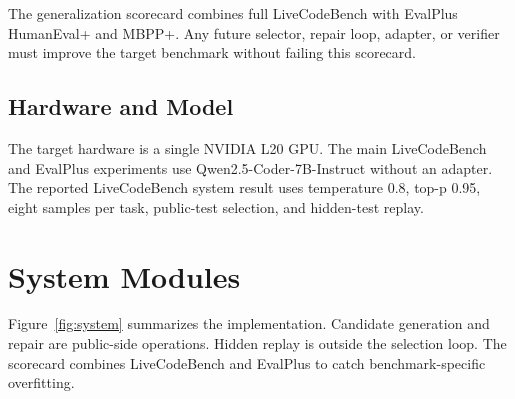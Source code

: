 \documentclass[11pt]{article}
\begin{document}
The generalization scorecard combines full LiveCodeBench with EvalPlus
HumanEval+ and MBPP+. Any future selector, repair loop, adapter, or verifier
must improve the target benchmark without failing this scorecard.

\subsection{Hardware and Model}

The target hardware is a single NVIDIA L20 GPU. The main LiveCodeBench and
EvalPlus experiments use Qwen2.5-Coder-7B-Instruct without an adapter. The
reported LiveCodeBench system result uses temperature 0.8, top-p 0.95, eight
samples per task, public-test selection, and hidden-test replay.

\section{System Modules}

Figure~\ref{fig:system} summarizes the implementation. Candidate generation and
repair are public-side operations. Hidden replay is outside the selection loop.
The scorecard combines LiveCodeBench and EvalPlus to catch benchmark-specific
overfitting.
\end{document}
